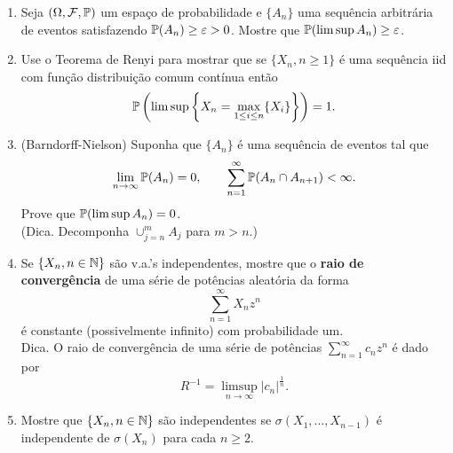 \begin{enumerate}[leftmargin=*]
\item Seja $(\Omega,\F,\P)$ um espaço de probabilidade e 
$\{A_n\}$ uma sequência arbitrária de eventos satisfazendo 
$\P(A_n)\geq \varepsilon>0$.
Mostre que $\P(\limsup A_n)\geq \varepsilon$.








\item 
Use o Teorema de Renyi para mostrar que se 
$\{X_n, n\geq 1\}$ é uma sequência iid com função distribuição
comum contínua então 
	\[
		\P\left( \limsup \left\{ X_n = \max_{1\leq i\leq n}\{X_i\}\right\} \right)
		=1.
	\]






\item 
(Barndorff-Nielson) Suponha que $\{A_n\}$ é uma sequência
de eventos tal que 
\[
	\lim_{n\to\infty} \P(A_n)=0,
	\qquad
	\sum_{n=1}^{\infty} \P(A_n\cap A_{n+1})<\infty.
\]
Prove que $\P(\limsup A_n)=0$. 
\\
(Dica. Decomponha $\cup_{j=n}^m A_j$ para $m>n$.)














\item 
Se $\{X_n, n\in\N\}$ são v.a.'s independentes, mostre que
o {\bf raio de convergência} de uma série de potências aleatória 
da forma 
	\[
		\sum_{n=1}^{\infty} X_n z^n
	\]
é constante (possivelmente infinito) com probabilidade um.
\\
Dica. O raio de convergência de uma série de potências 
$\sum_{n=1}^{\infty} c_nz^n$ é dado por 
	\[
		R^{-1} = \limsup_{n\to\infty} |c_n|^{\frac{1}{n}}.
	\]





\item 
Mostre que $\{X_n, n\in\N\}$ são independentes se 
$\sigma(X_1,\ldots,X_{n-1})$ 
é independente de $\sigma(X_n)$ para cada $n\geq 2$.










\end{enumerate}
